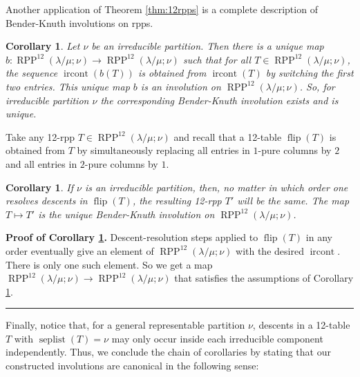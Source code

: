 \documentclass[12pt]{article}
\theoremstyle{plain}
\newtheorem{corollary}[theorem]{Corollary}
\theoremstyle{definition}
\newenvironment{proof}[1][Proof]{\noindent\textbf{#1.} }{\ \rule{0.5em}{0.5em}}
\newcommand{\kk}{\mathbf{k}}
\def\seplist{{\operatorname{seplist}}} %
\def\ircont{{\operatorname{ircont}}}
\def\seplistvar{{{\nu}}} %
\def\g{{\widetilde{g}}}
\def\lm{{\lambda/\mu}}
\def\Z{{\mathbb{Z}}}
\def\OneTwoRPPCutvar{{\operatorname{RPP}^{12}\left(  \lambda/\mu ;\seplistvar \right)}}
\def\flip{{\operatorname{flip}}}
\begin{document}

Another application of Theorem \ref{thm:12rpps} is a complete description of Bender-Knuth involutions on rpps.

\begin{corollary}
\label{cor:uniqueBK}
Let $\seplistvar$ be an irreducible partition. Then there is a unique map \newline $b:\OneTwoRPPCutvar\to\OneTwoRPPCutvar$ such that for all $T\in\OneTwoRPPCutvar$, the sequence $\ircont(b(T))$ is obtained from $\ircont(T)$ by switching the first two entries.
This unique map $b$ is an involution on $\OneTwoRPPCutvar$. So, for irreducible partition $\seplistvar$ the corresponding Bender-Knuth involution exists and is unique.
\end{corollary}

Take any 12-rpp $T\in\OneTwoRPPCutvar$ and recall that a 12-table $\flip(T)$ is obtained from $T$ by simultaneously replacing all entries in $1$-pure columns by $2$ and all entries in $2$-pure columns by $1$. 

\begin{corollary}
\label{cor:confluence}
 If $\seplistvar$ is an irreducible partition, then, no matter in which order one resolves descents in $\flip(T)$, the resulting 12-rpp $T'$ will be the same. The map $T\mapsto T'$ is the unique Bender-Knuth involution on $\OneTwoRPPCutvar$.
\end{corollary}
\begin{proof}[Proof of Corollary \ref{cor:confluence}]
 Descent-resolution steps applied to $\flip(T)$ in any order eventually give an element of $\OneTwoRPPCutvar$ with the desired $\ircont$. There is only one such element. So we get a map $\OneTwoRPPCutvar\to \OneTwoRPPCutvar$ that satisfies the assumptions of Corollary \ref{cor:uniqueBK}.
\end{proof}

Finally, notice that, for a general representable partition $\seplistvar$, descents in a 12-table $T$ with $\seplist(T) = \nu$ may only occur inside each irreducible component independently. Thus, we conclude the chain of corollaries by stating that our constructed involutions are canonical in the following sense:
\end{document}
